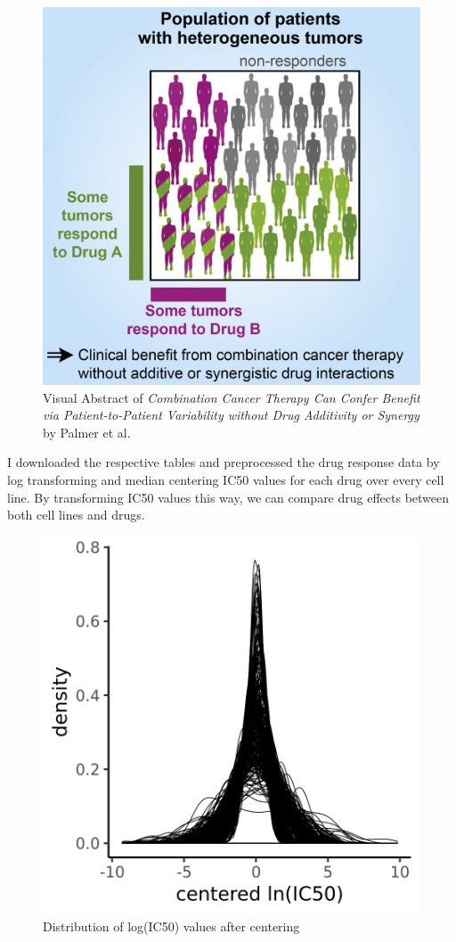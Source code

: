 \documentclass[]{article}
\begin{document}
\begin{figure}
\centering
\includegraphics{vis_abstract.jpg}
\caption{Visual Abstract of \emph{Combination Cancer Therapy Can Confer
Benefit via Patient-to-Patient Variability without Drug Additivity or
Synergy} by Palmer et al.}
\end{figure}

I downloaded the respective tables and preprocessed the drug response
data by log transforming and median centering IC50 values for each drug
over every cell line. By transforming IC50 values this way, we can
compare drug effects between both cell lines and drugs.

\begin{figure}
\centering
\includegraphics{center_ic50.png}
\caption{Distribution of log(IC50) values after centering}
\end{figure}
\end{document}
